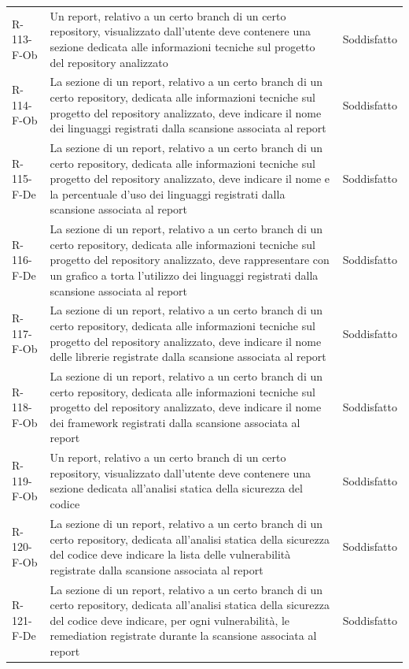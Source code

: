 \documentclass[a4paper, 11pt]{article}
\begin{document}
\begin{longtable}[c]{ >{\centering\arraybackslash}m{2.5cm} >{\centering\arraybackslash}m{8.3cm} >{\centering\arraybackslash}m{3.5cm} }
R-113-F-Ob & Un report, relativo a un certo branch di un certo repository, visualizzato dall'utente deve contenere una sezione dedicata alle informazioni tecniche sul progetto del repository analizzato & Soddisfatto\\
R-114-F-Ob & La sezione di un report, relativo a un certo branch di un certo repository, dedicata alle informazioni tecniche sul progetto del repository analizzato, deve indicare il nome dei linguaggi registrati dalla scansione associata al report & Soddisfatto\\
R-115-F-De & La sezione di un report, relativo a un certo branch di un certo repository, dedicata alle informazioni tecniche sul progetto del repository analizzato, deve indicare il nome e la percentuale d'uso dei linguaggi registrati dalla scansione associata al report & Soddisfatto\\
R-116-F-De & La sezione di un report, relativo a un certo branch di un certo repository, dedicata alle informazioni tecniche sul progetto del repository analizzato, deve rappresentare con un grafico a torta l'utilizzo dei linguaggi registrati dalla scansione associata al report & Soddisfatto\\
R-117-F-Ob & La sezione di un report, relativo a un certo branch di un certo repository, dedicata alle informazioni tecniche sul progetto del repository analizzato, deve indicare il nome delle librerie registrate dalla scansione associata al report & Soddisfatto\\
R-118-F-Ob & La sezione di un report, relativo a un certo branch di un certo repository, dedicata alle informazioni tecniche sul progetto del repository analizzato, deve indicare il nome dei framework registrati dalla scansione associata al report & Soddisfatto\\
R-119-F-Ob & Un report, relativo a un certo branch di un certo repository, visualizzato dall'utente deve contenere una sezione dedicata all'analisi statica della sicurezza del codice & Soddisfatto\\
R-120-F-Ob & La sezione di un report, relativo a un certo branch di un certo repository, dedicata all'analisi statica della sicurezza del codice deve indicare la lista delle vulnerabilità registrate dalla scansione associata al report & Soddisfatto\\
R-121-F-De & La sezione di un report, relativo a un certo branch di un certo repository, dedicata all'analisi statica della sicurezza del codice deve indicare, per ogni vulnerabilità, le remediation registrate durante la scansione associata al report & Soddisfatto\\

\end{longtable}
\end{document}
